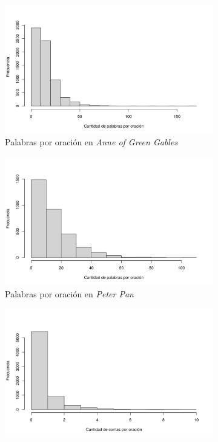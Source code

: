 \documentclass[12pt]{article}
\begin{document}
	\begin{figure}
		\begin{subfigure}{.5\textwidth}
			\centering
			\includegraphics[scale=0.4]{hist_ppo_anne.png}
			\caption{Palabras por oración en \em Anne of Green Gables}
			\label{ppo_anne}
		\end{subfigure}
		\begin{subfigure}{0.5\textwidth}
			\centering
			\includegraphics[scale=0.4]{hist_ppo_peter.png}
			\caption{Palabras por oración en \em Peter Pan}
			\label{ppo_peter}
		\end{subfigure}
				\begin{subfigure}{.5\textwidth}
			\centering
			\includegraphics[scale=0.4]{hist_cpo_anne.png}

\end{subfigure}
\end{figure}
\end{document}
